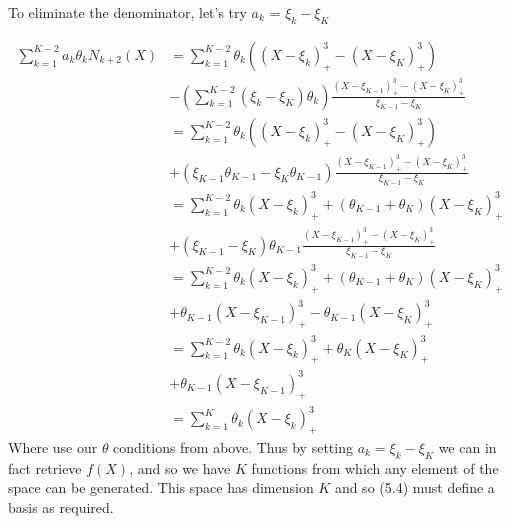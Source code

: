 To eliminate the denominator, let's try $a_k$ = $\xi_k - \xi_K$

\begin{align*}
    \sum_{k=1}^{K-2}a_k \theta_k N_{k+2}(X)  &=  \sum_{k=1}^{K-2 }\theta_k \left( (X - \xi_k)^3_+ - (X - \xi_K)^3_+ \right) \\ 
    &- \left(\sum_{k=1}^{K-2 }(\xi_k - \xi_K) \theta_k \right) \frac{(X - \xi_{K-1})^3_+ - (X  - \xi_K)^3_+}{\xi_{K-1} - \xi_K} \\
    &=  \sum_{k=1}^{K-2 }\theta_k \left( (X - \xi_k)^3_+ - (X - \xi_K)^3_+ \right)\\
    &+ (\xi_{K-1}\theta_{K-1} - \xi_{K}\theta_{K-1})  \frac{(X - \xi_{K-1})^3_+ - (X  - \xi_K)^3_+}{\xi_{K-1} - \xi_K}\\
    &=  \sum_{k=1}^{K-2 }\theta_k (X - \xi_k)^3_+  + (\theta_{K-1} + \theta_K) (X - \xi_K)^3_+\\
    &+ (\xi_{K-1}- \xi_{K})\theta_{K-1} \frac{(X - \xi_{K-1})^3_+ - (X  - \xi_K)^3_+}{\xi_{K-1} - \xi_K}\\
    &=  \sum_{k=1}^{K-2 }\theta_k (X - \xi_k)^3_+  + (\theta_{K-1} + \theta_K) (X - \xi_K)^3_+\\
    &+ \theta_{K-1} (X - \xi_{K-1})^3_+ - \theta_{K-1}(X  - \xi_K)^3_+\\
    &=  \sum_{k=1}^{K-2 }\theta_k (X - \xi_k)^3_+  + \theta_K (X - \xi_K)^3_+\\
    &+ \theta_{K-1} (X - \xi_{K-1})^3_+\\
    &=  \sum_{k=1}^{K }\theta_k (X - \xi_k)^3_+
\end{align*}
Where use our $\theta$ conditions from above.
Thus by setting $a_k = \xi_k - \xi_K$ we can in fact retrieve $f(X)$, and so we have $K$ functions from which any element of the space can be generated. This space has dimension $K$ and so (5.4) must define a basis as required.